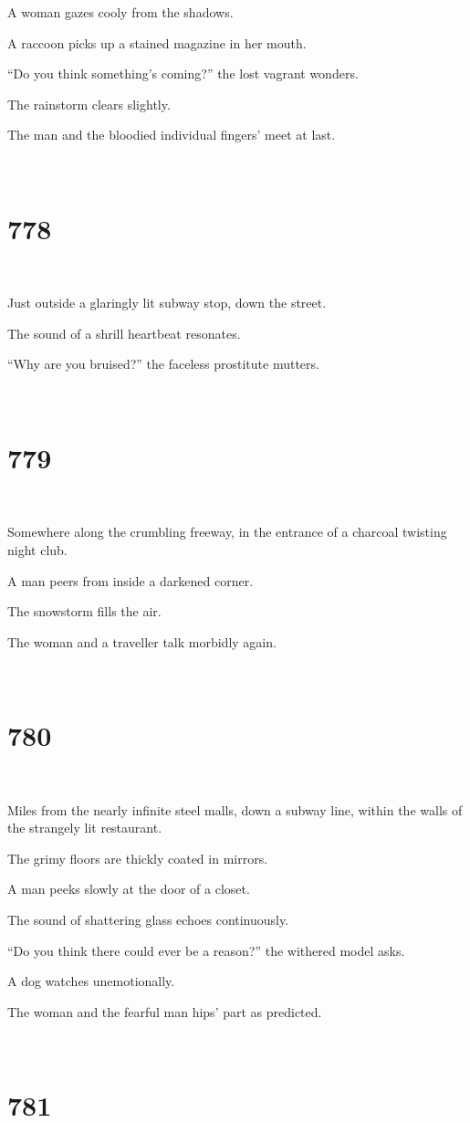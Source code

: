 \documentclass{report}
\begin{document}
A woman gazes cooly from the shadows.

A raccoon picks up a stained magazine in her mouth.

``Do you think something's coming?'' the lost vagrant wonders.

The rainstorm clears slightly.

The man and the bloodied individual fingers' meet at last.

~
\chapter*{778}
~

Just outside a glaringly lit subway stop, down the street.

The sound of a shrill heartbeat resonates.

``Why are you bruised?'' the faceless prostitute mutters.

~
\chapter*{779}
~

Somewhere along the crumbling freeway, in the entrance of a charcoal twisting night club.

A man peers from inside a darkened corner.

The snowstorm fills the air.

The woman and a traveller talk morbidly again.

~
\chapter*{780}
~

Miles from the nearly infinite steel malls, down a subway line, within the walls of the strangely lit restaurant.

The grimy floors are thickly coated in mirrors.

A man peeks slowly at the door of a closet.

The sound of shattering glass echoes continuously.

``Do you think there could ever be a reason?'' the withered model asks.

A dog watches unemotionally.

The woman and the fearful man hips' part as predicted.

~
\chapter*{781}
~
\end{document}
